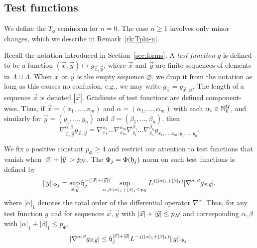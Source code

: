 
\subsection{Test functions}

We define the $T_\phi$ seminorm for $n = 0$. The case $n \ge 1$ involves only
minor changes, which we describe in Remark~\ref{rk:Tphi-n}.

Recall the notation introduced in Section~\ref{sec:forms}.
A \emph{test function} $g$ is defined to be a function $(\vec x, \vec y) \mapsto g_{\vec x,\vec y}$,
where $\vec x$ and $\vec y$ are finite sequences of elements in $\Lambda \sqcup \bar\Lambda$.
When $\vec x$ or $\vec y$ is the empty sequence $\varnothing$,
we drop it from the notation as long as this causes no confusion;
e.g., we may write $g_{\vec x} = g_{\vec x,\varnothing}$.
The length of a sequence $\vec x$ is denoted $|\vec x|$.
Gradients of test functions are defined component-wise.
Thus, if $\vec x = (x_1, \ldots, x_m)$
and $\alpha = (\alpha_1, \ldots, \alpha_m)$
with each $\alpha_i \in {\mathbb N}_0^{\mathcal{U}}$, and similarly for $\vec y=(y_1,\ldots,y_n)$ and
$\beta=(\beta_1,\ldots,\beta_n)$,
then
\begin{equation}
\nabla^{\alpha,\beta}_{\vec x,\vec y} g_{\vec x,\vec y}
  =
\nabla^{\alpha_1}_{x_1} \ldots \nabla^{\alpha_m}_{x_m}
\nabla^{\beta_1}_{y_1} \ldots \nabla^{\beta_n}_{y_n}  g_{x_1,\ldots,x_m,y_1,\ldots,y_n}.
\end{equation}

We fix a positive constant $p_\Phi\ge 4$ and restrict our attention to test functions
that vanish when $|\vec x|  +|\vec y| > p_{\mathcal{N}}$.
The $\Phi_j = \Phi(\mathfrak{h}_j)$ norm on such test functions is defined by
\begin{equation}
\|g\|_{\Phi_j}
	=
\sup_{\vec x, \vec y} \h_j^{-(|\vec x| +|\vec y|)}
	\shift\shift
\sup_{\alpha,\beta: |\alpha|_1+|\beta|_1 \le p_\Phi}
L^{j (|\alpha|_1 + |\beta|_1)}
|\nabla^{\alpha,\beta} g_{\vec x, \vec y}|,
\end{equation}
where $|\alpha|_1$ denotes the total order of the differential operator $\nabla^\alpha$.
Thus, for any test function $g$ and for sequences
$\vec x, \vec y$ with $|\vec x| +|\vec y| \leq p_{\mathcal{N}}$ and
corresponding $\alpha, \beta$ with $|\alpha|_1 + |\beta|_1 \leq p_\Phi$,
\begin{equation}
\label{e:testfcnbd}
|\nabla^{\alpha,\beta} g_{\vec x,\vec y}|
	\leq
\mathfrak{h}_j^{|\vec x| + |\vec y|} L^{-j (|\alpha|_1 + |\beta|_1)} \|g\|_{\Phi_j}.
\end{equation}

